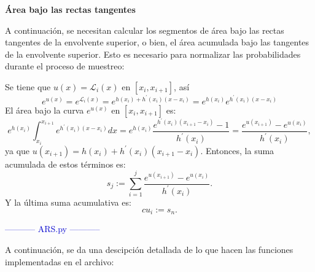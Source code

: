\newpage
\textbf{Área bajo las rectas tangentes}

A continuación, se necesitan calcular los segmentos de área bajo las rectas tangentes de la envolvente superior, o bien, el área acumulada bajo las tangentes de la envolvente superior. Esto es necesario para normalizar las probabilidades durante el proceso de muestreo:

Se tiene que $u(x) = \mathcal{L}_{i} (x)$ en $[x_i, x_{i+1}]$, así
\begin{equation*}
	e^{u(x)} = e^{\mathcal{L}_{i} (x)} = e^{h(x_{i}) + h^{'}(x_{i}) (x - x_{i})} = e^{h(x_{i})} e^{h^{'}(x_{i}) (x - x_{i})}
\end{equation*}
El área bajo la curva $e^{u(x)}$ en $[x_i, x_{i+1}]$ es:
\begin{equation} \label{eq:9}
	e^{h(x_{i})} \int_{x_{i}}^{x_{i+1}}  e^{h^{'}(x_{i}) (x - x_{i})} dx = e^{h(x_{i})} \frac{e^{h^{'}(x_{i}) (x_{i+1} - x_{i})} - 1}{h^{'}(x_{i})} = \frac{e^{u(x_{i+1})} - e^{u(x_{i})}}{h^{'}(x_{i})},
\end{equation}
ya que $u(x_{i+1}) = h(x_{i}) + h^{'}(x_{i}) (x_{i+1} - x_{i})$. Entonces, la suma acumulada de estos términos es:
\begin{equation}\label{eq:10}
	s_{j} := \sum_{i=1}^{j}  \frac{e^{u(x_{i+1})} - e^{u(x_{i})}}{h^{'}(x_{i})}.
\end{equation}
Y la última suma acumulativa es: 
\begin{equation} \label{eq:11}
	cu_i := s_{n}.
\end{equation}

\vspace{5mm}
\begin{center}
	\textcolor{mediumblue}{----------- ARS.py -----------}
\end{center}

A continuación, se da una descipción detallada de lo que hacen las funciones implementadas en el archivo:

